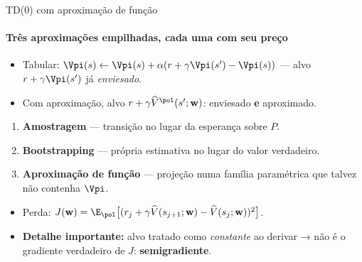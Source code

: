 \documentclass[aspectratio=169, 11pt]{beamer}
\newcommand{\Vhat}{\widehat{V}}
\newcommand{\wv}{\mathbf{w}}
\begin{document}
\begin{frame}{TD(0) com aproximação de função}
  \framesubtitle{Três aproximações empilhadas, cada uma com seu preço}

  \begin{itemize}\setlength{\itemsep}{0.3ex}
    \item Tabular: $\Vpi(s) \leftarrow \Vpi(s) + \alpha(r + \gamma \Vpi(s') - \Vpi(s))$
      — alvo $r + \gamma\Vpi(s')$ já \emph{enviesado}.
    \item Com aproximação, alvo $r + \gamma\Vhat^{\pol}(s';\wv)$:
      enviesado \textbf{e} aproximado.
  \end{itemize}

  \begin{alertabox}
    \begin{enumerate}\setlength{\itemsep}{0.2ex}
      \item \textbf{Amostragem} --- transição no lugar da esperança sobre $P$.
      \item \textbf{Bootstrapping} --- própria estimativa no lugar do valor
        verdadeiro.
      \item \textbf{Aproximação de função} --- projeção numa família
        paramétrica que talvez não contenha $\Vpi$.
    \end{enumerate}
  \end{alertabox}

  \vspace{-0.3em}
  \begin{itemize}\setlength{\itemsep}{0.3ex}
    \item Perda:
      $J(\wv) = \E_{\pol}\bigl[(r_j + \gamma\Vhat(s_{j+1};\wv) - \Vhat(s_j;\wv))^2\bigr]$.
    \item \textbf{Detalhe importante:} alvo tratado como \emph{constante}
      ao derivar → não é o gradiente verdadeiro de $J$: \textbf{semigradiente}.
  \end{itemize}
\end{frame}
\end{document}
